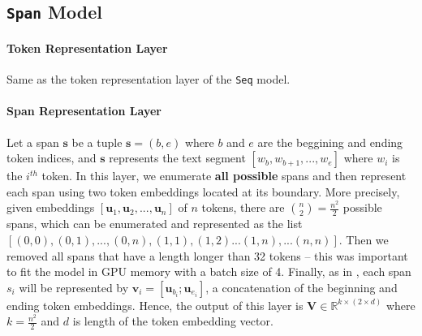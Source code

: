 \documentclass[11pt]{article}
\renewcommand{\vec}[1]{\mathbf{#1}}
\begin{document}
\subsection{\texttt{Span} Model}

























\paragraph{Token Representation Layer} Same as the token representation layer of the \texttt{Seq} model.

\paragraph{Span Representation Layer} 
Let a span $\vec{s}$ be a tuple $\vec{s} = (b,e)$ where $b$ and $e$ are the
beggining and ending token indices, and $\vec{s}$ represents the text segment
$[w_{b}, w_{b+1}, ..., w_{e}]$ where $w_{i}$ is the $i^{th}$ token.
In this layer, we enumerate \textbf{all possible} spans and then represent 
each span using two token embeddings located at its boundary. 
More precisely, given embeddings  $[\vec{u}_{1}, \vec{u}_{2},
..., \vec{u}_{n}]$ of $n$ tokens, there are $\binom{n}{2} = \frac{n^{2}}{2}$
possible spans, which can be enumerated and represented as the list
$[(0,0), (0,1), ..., (0,n), (1,1), (1,2) ...(1,n),... (n,n)]$. Then we removed all spans that have a length longer than 32 tokens -- this was important to fit the model in GPU memory with a batch size of 4. Finally, as in \cite{lee-etal-2017-end}, each span $s_{i}$ will be represented by
$\vec{v}_{i} = [\vec{u}_{b_{i}};\vec{u}_{e_{i}}]$, a concatenation of the
beginning and ending token embeddings. Hence, the output of this layer is
$\textbf{V} \in \mathbb{R}^{k \times (2 \times d)}$ where $k = \frac{n^{2}}{2}$
and $d$ is length of the token embedding vector.
\end{document}
